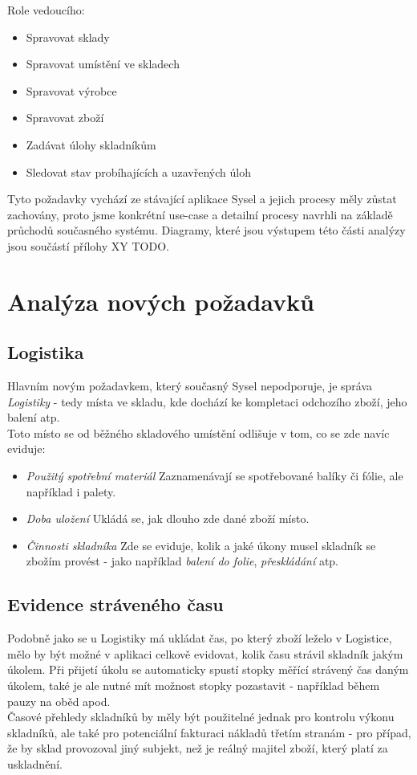 Role vedoucího:
\begin{itemize}
	\item Spravovat sklady
	\item Spravovat umístění ve skladech
	\item Spravovat výrobce
	\item Spravovat zboží
	\item Zadávat úlohy skladníkům
	\item Sledovat stav probíhajících a uzavřených úloh
\end{itemize}

Tyto požadavky vychází ze stávající aplikace Sysel a jejich procesy měly zůstat zachovány, proto jsme konkrétní use-case a detailní procesy navrhli na základě průchodů současného systému. Diagramy, které jsou výstupem této části analýzy jsou součástí přílohy XY TODO.

\section{Analýza nových požadavků}

\subsection{Logistika}

Hlavním novým požadavkem, který současný Sysel nepodporuje, je správa \emph{Logistiky} - tedy místa ve skladu, kde dochází ke kompletaci odchozího zboží, jeho balení atp.\\
Toto místo se od běžného skladového umístění odlišuje v tom, co se zde navíc eviduje:
\begin{itemize}
	\item \emph{Použitý spotřební materiál} Zaznamenávají se spotřebované balíky či fólie, ale například i palety.
	\item \emph{Doba uložení} Ukládá se, jak dlouho zde dané zboží  místo.
	\item \emph{Činnosti skladníka} Zde se eviduje, kolik a jaké úkony musel skladník se zbožím provést - jako například \emph{balení do folie}, \emph{přeskládání} atp.
\end{itemize}

\subsection{Evidence stráveného času}

Podobně jako se u Logistiky má ukládat čas, po který zboží leželo v Logistice, mělo by být možné v aplikaci celkově evidovat, kolik času strávil skladník jakým úkolem. Při přijetí úkolu se automaticky spustí stopky měřící strávený čas daným úkolem, také je ale nutné mít možnost stopky pozastavit - například během pauzy na oběd apod.\\
Časové přehledy skladníků by měly být použitelné jednak pro kontrolu výkonu skladníků, ale také pro potenciální fakturaci nákladů třetím stranám - pro případ, že by sklad provozoval jiný subjekt, než je reálný majitel zboží, který platí za uskladnění.

